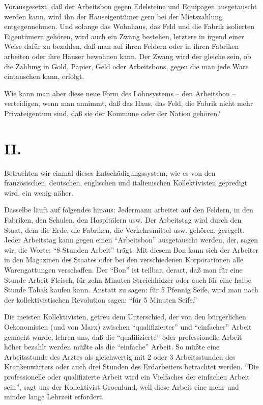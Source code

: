 \documentclass{scrbook}
\begin{document}
Vorausgesetzt, daß der Arbeitsbon gegen Edelsteine und Equipagen ausgetauscht werden kann, wird ihn der Hauseigentümer gern bei der Mietszahlung entgegennehmen. Und solange das Wohnhaus, das Feld und die Fabrik isolierten Eigentümern gehören, wird auch ein Zwang bestehen, letztere in irgend einer Weise dafür zu bezahlen, daß man auf ihren Feldern oder in ihren Fabriken arbeiten oder ihre Häuser bewohnen kann. Der Zwang wird der gleiche sein, ob die Zahlung in Gold, Papier, Geld oder Arbeitsbons, gegen die man jede Ware eintauschen kann, erfolgt.

Wie kann man aber diese neue Form des Lohnsystems – den Arbeitsbon – verteidigen, wenn man annimmt, daß das Haus, das Feld, die Fabrik nicht mehr Privateigentum sind, daß sie der Kommune oder der Nation gehören?

\section*{II.}

Betrachten wir einmal dieses Entschädigungssystem, wie es von den französischen, deutschen, englischen und italienischen Kollektivisten gepredigt wird, ein wenig näher.

Dasselbe läuft auf folgendes hinaus: Jedermann arbeitet auf den Feldern, in den Fabriken, den Schulen, den Hospitälern usw. Der Arbeitstag wird durch den Staat, dem die Erde, die Fabriken, die Verkehrsmittel usw. gehören, geregelt. Jeder Arbeitstag kann gegen einen ``Arbeitsbon'' ausgetauscht werden, der, sagen wir, die Worte: ``8 Stunden Arbeit'' trägt. Mit diesem Bon kann sich der Arbeiter in den Magazinen des Staates oder bei den verschiedenen Korporationen alle Warengattungen verschaffen. Der ``Bon'' ist teilbar, derart, daß man für eine Stunde Arbeit Fleisch, für zehn Minuten Streichhölzer oder auch für eine halbe Stunde Tabak kaufen kann. Anstatt zu sagen: für 5 Pfennig Seife, wird man nach der kollektivistischen Revolution sagen: ``für 5 Minuten Seife.''

Die meisten Kollektivisten, getreu dem Unterschied, der von den bürgerlichen Oekonomisten (und von Marx) zwischen ``qualifizierter'' und ``einfacher'' Arbeit gemacht wurde, lehren uns, daß die ``qualifizierte'' oder professionelle Arbeit höher bezahlt werden müßte als die ``einfache'' Arbeit. So müßte eine Arbeitsstunde des Arztes als gleichwertig mit 2 oder 3 Arbeitsstunden des Krankenwärters oder auch drei Stunden des Erdarbeiters betrachtet werden. ``Die professionelle oder qualifizierte Arbeit wird ein Vielfaches der einfachen Arbeit sein'', sagt uns der Kollektivist Groenlund, weil diese Arbeit eine mehr und minder lange Lehrzeit erfordert.
\end{document}
